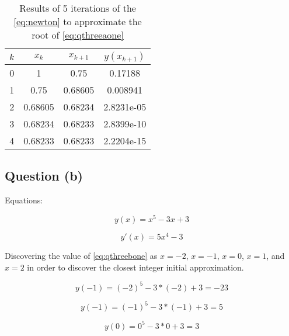 		\begin{table}[H]
			\begin{center}
				\begin{tabular}{|c||c||c|c|}
					\hline
					\textbf{$k$} & \textbf{$x_{k}$} & \textbf{$x_{k+1}$} & \textbf{$y(x_{k+1})$} \\ \hline
					0 & 1 & 0.75 & 0.17188  \\ \hline
					1 & 0.75 & 0.68605 & 0.008941  \\ \hline
					2 & 0.68605 & 0.68234 & 2.8231e-05  \\ \hline
					3 & 0.68234 & 0.68233 & 2.8399e-10  \\ \hline
					4 & 0.68233 & 0.68233 & 2.2204e-15  \\ \hline
				\end{tabular}
				\caption{Results of 5 iterations of the \cref{eq:newton} to approximate the root of \cref{eq:qthreeaone}}
				\label{tab:qthreea}
			\end{center}
		\end{table}

	\subsection{Question (b)}
		
		Equations:

		\begin{equation}
			y(x) = x^5 - 3x + 3
		\label{eq:qthreebone}
		\end{equation}

		\begin{equation}
			y'(x) = 5x^4 - 3
		\label{eq:qthreeboned}
		\end{equation}

		Discovering the value of \cref{eq:qthreebone} as $x = -2$, $x = -1$, $x = 0$, $x = 1$, and $x = 2$ in order to discover the closest integer initial approximation.

		\begin{equation}
			y(-1) = (-2)^5 - 3*(-2) + 3 = -23
		\label{eq:qthreebxmtwo}
		\end{equation}

		\begin{equation}
			y(-1) = (-1)^5 - 3*(-1) + 3 = 5
		\label{eq:qthreebxmone}
		\end{equation}

		\begin{equation}
			y(0) = 0^5 - 3*0 + 3 = 3
		\label{eq:qthreebxzero}
		\end{equation}

